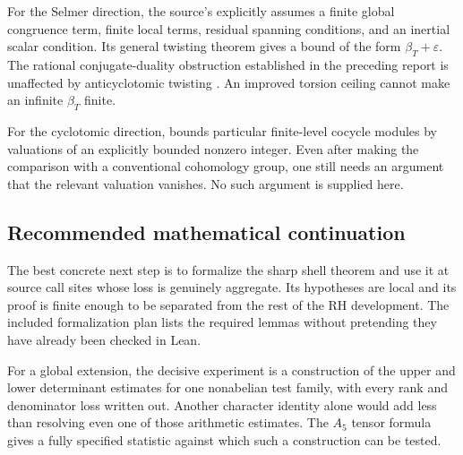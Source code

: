 For the Selmer direction, the source's  explicitly assumes a finite global congruence term, finite local terms, residual spanning conditions, and an inertial scalar condition. Its general twisting theorem gives a bound of the form \(\beta_T+\varepsilon\). The rational conjugate-duality obstruction established in the preceding report is unaffected by anticyclotomic twisting \cite{structuralprior}. An improved torsion ceiling cannot make an infinite \(\beta_T\) finite.

For the cyclotomic direction,  bounds particular finite-level cocycle modules by valuations of an explicitly bounded nonzero integer. Even after making the comparison with a conventional cohomology group, one still needs an argument that the relevant valuation vanishes. No such argument is supplied here.

\subsection{Recommended mathematical continuation}
The best concrete next step is to formalize the sharp shell theorem and use it at source call sites whose loss is genuinely aggregate. Its hypotheses are local and its proof is finite enough to be separated from the rest of the RH development. The included formalization plan lists the required lemmas without pretending they have already been checked in Lean.

For a global extension, the decisive experiment is a construction of the upper and lower determinant estimates for one nonabelian test family, with every rank and denominator loss written out. Another character identity alone would add less than resolving even one of those arithmetic estimates. The \(A_5\) tensor formula gives a fully specified statistic against which such a construction can be tested.

